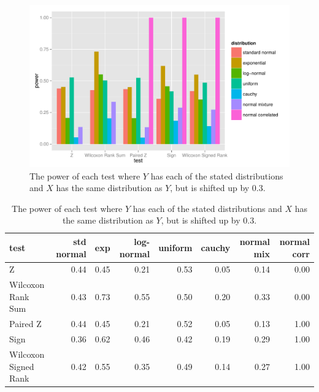 \documentclass[11pt]{article}
\begin{document}
\begin{figure}[H]
\centering
\includegraphics[scale = 0.8]{part2.pdf}
\caption{The power of each test where $Y$ has each of the stated distributions and $X$ has the same distribution as $Y$, but is shifted up by 0.3.}
\label{fig:part2}
\end{figure}


\begin{table}[ht]
\centering
\begin{tabular}{lrrrrrrr}
  \hline
test & std normal & exp & log-normal & uniform & cauchy & normal mix & normal corr \\ 
  \hline
Z & 0.44 & 0.45 & 0.21 & 0.53 & 0.05 & 0.14 & 0.00 \\ 
 Wilcoxon Rank Sum & 0.43 & 0.73 & 0.55 & 0.50 & 0.20 & 0.33 & 0.00 \\ 
 Paired Z & 0.44 & 0.45 & 0.21 & 0.52 & 0.05 & 0.13 & 1.00 \\ 
  Sign & 0.36 & 0.62 & 0.46 & 0.42 & 0.19 & 0.29 & 1.00 \\ 
  Wilcoxon Signed Rank & 0.42 & 0.55 & 0.35 & 0.49 & 0.14 & 0.27 & 1.00 \\ 
   \hline
\end{tabular}
\caption{The power of each test where $Y$ has each of the stated distributions and $X$ has the same distribution as $Y$, but is shifted up by 0.3.}
\label{tab:part2}
\end{table}
\end{document}
